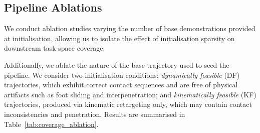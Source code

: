 \documentclass{article}
\begin{document}
\subsection{Pipeline Ablations}
We conduct ablation studies varying the number of base demonstrations provided at initialisation, allowing us to isolate the effect of initialisation sparsity on downstream task-space coverage.

Additionally, we ablate the nature of the base trajectory used to seed the pipeline. We consider two initialisation conditions: \textit{dynamically feasible} (DF) trajectories, which exhibit correct contact sequences and are free of physical artifacts such as foot sliding and interpenetration; and \textit{kinematically feasible} (KF) trajectories, produced via kinematic retargeting only, which may contain contact inconsistencies and penetration.
Results are summarised in Table~\ref{tab:coverage_ablation}.
\end{document}
